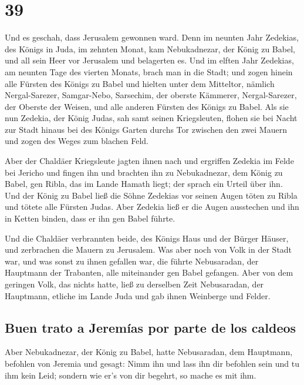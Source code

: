 \hypertarget{section-38}{%
\section{39}\label{section-38}}

 Und es geschah, dass Jerusalem gewonnen ward. Denn im
neunten Jahr Zedekias, des Königs in Juda, im zehnten Monat, kam
Nebukadnezar, der König zu Babel, und all sein Heer vor Jerusalem und
belagerten es.  Und im elften Jahr Zedekias, am neunten
Tage des vierten Monats, brach man in die Stadt;  und
zogen hinein alle Fürsten des Königs zu Babel und hielten unter dem
Mitteltor, nämlich Nergal-Sarezer, Samgar-Nebo, Sarsechim, der oberste
Kämmerer, Nergal-Sarezer, der Oberste der Weisen, und alle anderen
Fürsten des Königs zu Babel.  Als sie nun Zedekia, der
König Judas, sah samt seinen Kriegsleuten, flohen sie bei Nacht zur
Stadt hinaus bei des Königs Garten durchs Tor zwischen den zwei Mauern
und zogen des Weges zum blachen Feld.

 Aber der Chaldäer Kriegsleute jagten ihnen nach und
ergriffen Zedekia im Felde bei Jericho und fingen ihn und brachten ihn
zu Nebukadnezar, dem König zu Babel, gen Ribla, das im Lande Hamath
liegt; der sprach ein Urteil über ihn.  Und der König zu
Babel ließ die Söhne Zedekias vor seinen Augen töten zu Ribla und tötete
alle Fürsten Judas.  Aber Zedekia ließ er die Augen
ausstechen und ihn in Ketten binden, dass er ihn gen Babel führte.

 Und die Chaldäer verbrannten beide, des Königs Haus und
der Bürger Häuser, und zerbrachen die Mauern zu Jerusalem.
 Was aber noch von Volk in der Stadt war, und was sonst zu
ihnen gefallen war, die führte Nebusaradan, der Hauptmann der Trabanten,
alle miteinander gen Babel gefangen.  Aber von dem
geringen Volk, das nichts hatte, ließ zu derselben Zeit Nebusaradan, der
Hauptmann, etliche im Lande Juda und gab ihnen Weinberge und Felder.

\hypertarget{buen-trato-a-jeremuxedas-por-parte-de-los-caldeos}{%
\subsection{Buen trato a Jeremías por parte de los
caldeos}\label{buen-trato-a-jeremuxedas-por-parte-de-los-caldeos}}

 Aber Nebukadnezar, der König zu Babel, hatte
Nebusaradan, dem Hauptmann, befohlen von Jeremia und gesagt:
 Nimm ihn und lass ihn dir befohlen sein und tu ihm kein
Leid; sondern wie er's von dir begehrt, so mache es mit ihm.

